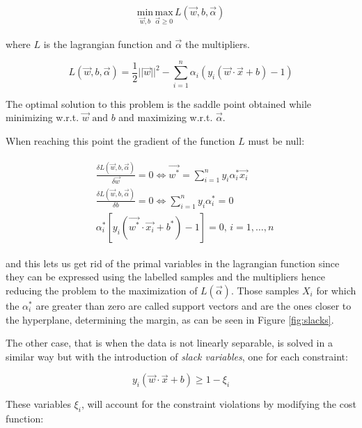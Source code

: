\begin{gather}
    \underset{\vec{w},b}{\mathrm{min}}\,\underset{\vec{\alpha}\geq 0}{\mathrm{max}}\,L(\vec{w},b,\vec{\alpha})
    \label{eq:ldual}
\end{gather}

where $L$ is the lagrangian function and $\vec{\alpha}$ the multipliers.

\begin{equation}
    L(\vec{w},b,\vec{\alpha}) = \frac{1}{2}||\vec{w}||^2 - \sum_{i=1}^n \alpha_i(y_i(\vec{w}\cdot\vec{x} + b) - 1)
    \label{eq:lagrange}
\end{equation}

The optimal solution to this problem is the saddle point obtained while minimizing
w.r.t. $\vec{w}\text{ and }b$ and maximizing w.r.t. $\vec{\alpha}$.

When reaching this point the gradient of the function $L$ must be null:

\begin{gather}
    \begin{aligned}
        & \frac{\delta L(\vec{w},b,\vec{\alpha})}{\delta\vec{w}} = 0 \iff \vec{w^*} = \sum^{n}_{i=1} y_i\alpha^*_i\vec{x_i}\\
        & \frac{\delta L(\vec{w},b,\vec{\alpha})}{\delta b} = 0 \iff \sum_{i=1}^{n} y_i\alpha^*_i = 0\\
        & \alpha^*_i[y_i(\vec{w^*}\cdot \vec{x_i}+b^*) - 1] = 0,\,i=1,\dots,n
        \label{eq:lagrangedual}
    \end{aligned}
\end{gather}

and this lets us get rid of the primal variables in the lagrangian function since
they can be expressed using the labelled samples and the multipliers hence
reducing the problem to the maximization of $L(\vec{\alpha})$.
Those samples $X_i$ for which the $\alpha^*_i$ are greater than zero are called
support vectors and are the ones closer to the hyperplane, determining the margin,
as can be seen in Figure \ref{fig:slacks}.

The other case, that is when the data is not linearly separable, is solved in a
similar way but with the introduction of \emph{slack variables}, one for each
constraint:

\begin{equation}
    y_i(\vec{w}\cdot\vec{x} + b) \geq 1 - \xi_i
\end{equation}

These variables $\xi_i$, will account for the constraint violations by modifying the cost
function:

